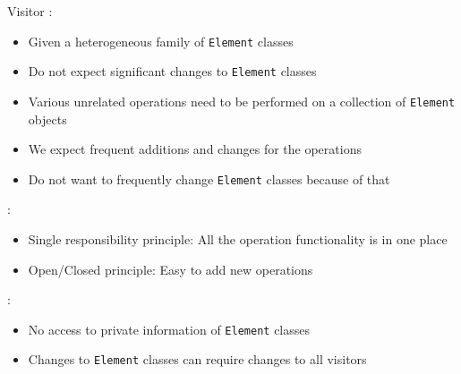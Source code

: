 \begin{frame}{Visitor}
	 :
	\begin{itemize}
		\item Given a heterogeneous family of \texttt{Element} classes
		\item Do not expect significant changes to \texttt{Element} classes 
		\item Various unrelated operations need to be performed on a collection of \texttt{Element} objects
		\item We expect frequent additions and changes for the operations
		\item Do not want to frequently change \texttt{Element} classes because of that 
		\end{itemize}
	
	\bigskip
	:
	\begin{itemize}
		\item Single responsibility principle: All the operation functionality is in one place
		\item Open/Closed principle: Easy to add new operations
	\end{itemize}
	
	\bigskip
	:
	\begin{itemize}
		\item No access to private information of \texttt{Element} classes
		\item Changes to \texttt{Element} classes can require changes to all visitors
	\end{itemize}
\end{frame}